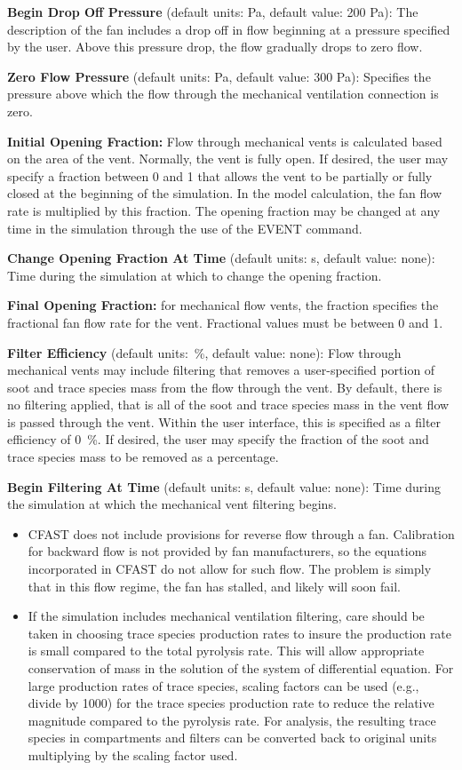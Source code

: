 \textbf{Begin Drop Off Pressure} (default units: Pa, default value: 200 Pa): The description of the fan includes a drop off in flow beginning at a pressure specified by the user.  Above this pressure drop, the flow gradually drops to zero flow.

\textbf{Zero Flow Pressure} (default units: Pa, default value: 300 Pa): Specifies the pressure above which the flow through the mechanical ventilation connection is zero.

\textbf{Initial Opening Fraction:} Flow through mechanical vents is calculated based on the area of the vent.  Normally, the vent is fully open.  If desired, the user may specify a fraction between 0 and 1 that allows the vent to be partially or fully closed at the beginning of the simulation.  In the model calculation, the fan flow rate is multiplied by this fraction.  The opening fraction may be changed at any time in the simulation through the use of the EVENT command.

\textbf{Change Opening Fraction At Time} (default units: s, default value: none): Time during the simulation at which to change the opening fraction.

\textbf{Final Opening Fraction:} for mechanical flow vents, the fraction specifies the fractional fan flow rate for the vent. Fractional values must be between 0 and 1.

\textbf{Filter Efficiency} (default units:~\%, default value: none): Flow through mechanical vents may include filtering that removes a user-specified portion of soot and trace species mass from the flow through the vent.  By default, there is no filtering applied, that is all of the soot and trace species mass in the vent flow is passed through the vent. Within the user interface, this is specified as a filter efficiency of 0~\%.  If desired, the user may specify the fraction of the soot and trace species mass to be removed as a percentage.

\textbf{Begin Filtering At Time} (default units: s, default value: none): Time during the simulation at which the mechanical vent filtering begins.

\begin{itemize}
\item CFAST does not include provisions for reverse flow through a fan. Calibration for backward flow is not provided by fan manufacturers, so the equations incorporated in CFAST do not allow for such flow. The problem is simply that in this flow regime, the fan has stalled, and likely will soon fail.
\item If the simulation includes mechanical ventilation filtering, care should be taken in choosing trace species production rates to insure the production rate is small compared to the total pyrolysis rate.  This will allow appropriate conservation of mass in the solution of the system of differential equation.  For large production rates of trace species, scaling factors can be used (e.g., divide by 1000) for the trace species production rate to reduce the relative magnitude compared to the pyrolysis rate.  For analysis, the resulting trace species in compartments and filters can be converted back to original units multiplying by the scaling factor used.
\end{itemize}

